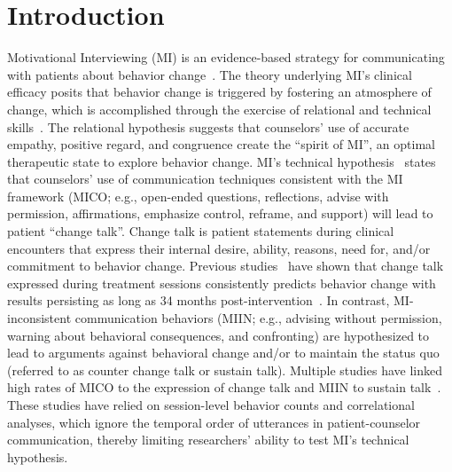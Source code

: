 \section{Introduction}
\label{sec:intro}
Motivational Interviewing (MI) is an evidence-based strategy for communicating with patients about behavior change~\cite{miller2013motivational}. The theory underlying MI's clinical efficacy posits that behavior change is triggered by fostering an atmosphere of change, which is accomplished through the exercise of relational and technical skills~\cite{miller2013motivational}. The relational hypothesis suggests that counselors' use of accurate empathy, positive regard, and congruence create the ``spirit of MI'', an optimal therapeutic state to explore behavior change. MI's technical hypothesis~\cite{miller2009toward} states that counselors' use of communication techniques consistent with the MI framework (MICO; e.g., open-ended questions, reflections, advise with permission, affirmations, emphasize control, reframe, and support) will lead to patient ``change talk''. Change talk is patient statements during clinical encounters that express their internal desire, ability, reasons, need for, and/or commitment to behavior change. Previous studies~\cite{apodaca2009mechanisms} have shown that change talk expressed during treatment sessions consistently predicts behavior change with results persisting as long as 34 months post-intervention~\cite{walker2011influence}. In contrast, MI-inconsistent communication behaviors (MIIN; e.g., advising without permission, warning about behavioral consequences, and confronting) are hypothesized to lead to arguments against behavioral change and/or to maintain the status quo (referred to as counter change talk or sustain talk). Multiple studies have linked high rates of MICO to the expression of change talk and MIIN to sustain talk~\cite{magill2014technical}. These studies have relied on session-level behavior counts and correlational analyses, which ignore the temporal order of utterances in patient-counselor communication, thereby limiting researchers' ability to test MI's technical hypothesis. 

